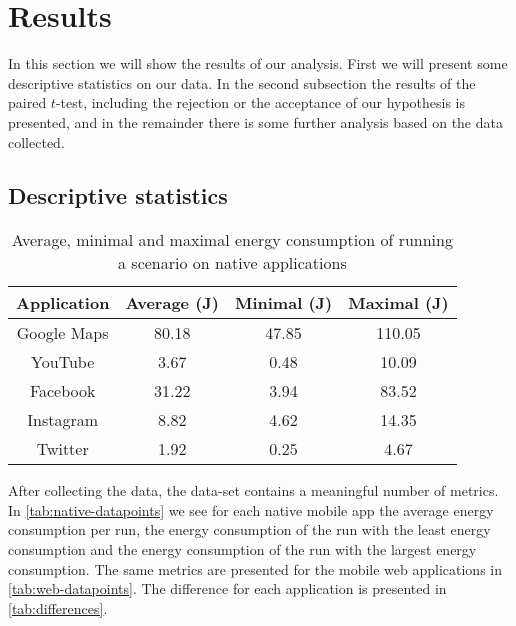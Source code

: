 \section{Results}\label{sec:results}
In this section we will show the results of our analysis. First we will present some descriptive statistics on our data. In the second subsection the results of the paired $t$-test, including the rejection or the acceptance of our hypothesis is presented, and in the remainder there is some further analysis based on the data collected.

\subsection{Descriptive statistics}
\begin{table}[h]
    \centering
\begin{tabular}{|c|c|c|c|}
    \hline
    Application & Average (J) & Minimal (J) & Maximal (J)\\
    \hline
    Google Maps & 80.18 & 47.85 & 110.05 \\
    YouTube & 3.67& 0.48 & 10.09\\
    Facebook & 31.22 & 3.94 &  83.52\\
    Instagram & 8.82 & 4.62 & 14.35\\
    Twitter & 1.92 & 0.25 & 4.67\\
    \hline
    \end{tabular}
    \caption{Average, minimal and maximal energy consumption of running a scenario on native applications}
    \label{tab:native-datapoints}
\end{table}


After collecting the data, the data-set contains a meaningful number of metrics. In \autoref{tab:native-datapoints} we see for each native mobile app the average energy consumption per run, the energy consumption of the run with the least energy consumption and the energy consumption of the run with the largest energy consumption. The same metrics are presented for the mobile web applications in \autoref{tab:web-datapoints}. The difference for each application is presented in \autoref{tab:differences}.

